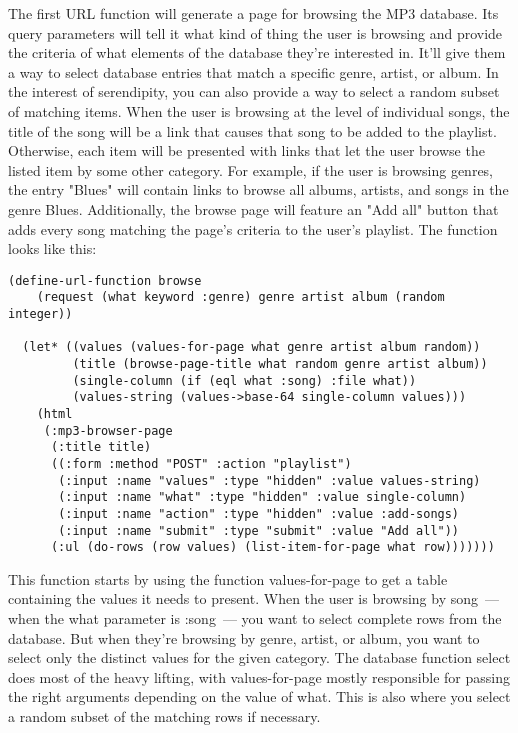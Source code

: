 The first URL function will generate a page for browsing the MP3 database. Its query
parameters will tell it what kind of thing the user is browsing and provide the criteria
of what elements of the database they're interested in. It'll give them a way to select
database entries that match a specific genre, artist, or album. In the interest of
serendipity, you can also provide a way to select a random subset of matching items. When
the user is browsing at the level of individual songs, the title of the song will be a
link that causes that song to be added to the playlist. Otherwise, each item will be
presented with links that let the user browse the listed item by some other category. For
example, if the user is browsing genres, the entry "Blues" will contain links to browse
all albums, artists, and songs in the genre Blues. Additionally, the browse page will
feature an "Add all" button that adds every song matching the page's criteria to the
user's playlist. The function looks like this:

\begin{lstlisting}
(define-url-function browse
    (request (what keyword :genre) genre artist album (random integer))

  (let* ((values (values-for-page what genre artist album random))
         (title (browse-page-title what random genre artist album))
         (single-column (if (eql what :song) :file what))
         (values-string (values->base-64 single-column values)))
    (html
     (:mp3-browser-page
      (:title title)
      ((:form :method "POST" :action "playlist")
       (:input :name "values" :type "hidden" :value values-string)
       (:input :name "what" :type "hidden" :value single-column)
       (:input :name "action" :type "hidden" :value :add-songs)
       (:input :name "submit" :type "submit" :value "Add all"))
      (:ul (do-rows (row values) (list-item-for-page what row)))))))
\end{lstlisting}

This function starts by using the function values-for-page to get a table containing the
values it needs to present. When the user is browsing by song~--- when the what parameter is
:song~--- you want to select complete rows from the database. But when they're browsing by
genre, artist, or album, you want to select only the distinct values for the given
category. The database function select does most of the heavy lifting, with
values-for-page mostly responsible for passing the right arguments depending on the value
of what. This is also where you select a random subset of the matching rows if necessary.

